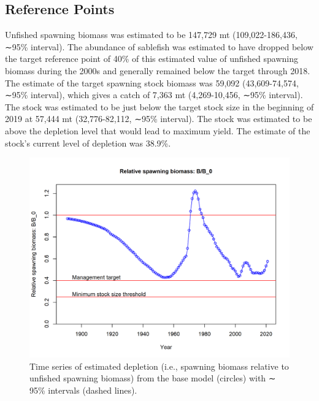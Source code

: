 \documentclass[11pt,
  english,
  a4paper,
]{article}
\begin{document}
\tagmcend\tagstructend


\hypertarget{reference-points}{%
\subsection*{Reference Points}\label{reference-points}}

\leavevmode\tagmcend\tagstructend


Unfished spawning biomass was estimated to be 147,729 mt (109,022-186,436, ∼95\% interval). The abundance of sablefish was estimated to have dropped below the target reference point of 40\% of this estimated value of unfished spawning biomass during the 2000s and generally remained below the target through 2018. The estimate of the target spawning stock biomass was 59,092 (43,609-74,574, ∼95\% interval), which gives a catch of 7,363 mt (4,269-10,456, ∼95\% interval). The stock was estimated to be just below the target stock size in the beginning of 2019 at 57,444 mt (32,776-82,112, ∼95\% interval). The stock was estimated to be above the depletion level that would lead to maximum yield. The estimate of the stock's current level of depletion was 38.9\%.

\leavevmode\tagmcend\tagstructend\par


\begin{figure}
\centering
\includegraphics[width=1\textwidth,height=1\textheight]{figs/ts9_Relative_spawning_biomass.png}
\caption{Time series of estimated depletion (i.e., spawning biomass relative to unfished spawning biomass) from the base model (circles) with ∼ 95\% intervals (dashed lines).\label{fig:ts9}}
\end{figure}
\end{document}
